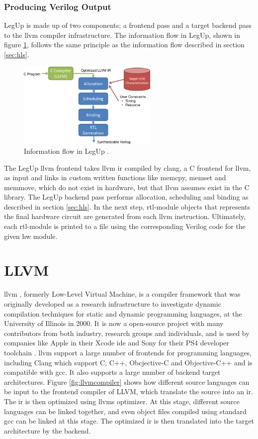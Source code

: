\subsubsection{Producing Verilog Output}
LegUp is made up of two components; a frontend pass and a target backend pass to the \gls{llvm} compiler infrastructure. 
The information flow in LegUp, shown in figure \ref{fig:legupflow}, follows the same principle as the information flow described in section \ref{sec:hls}.
\begin{figure}[hbpt]
\centering
\includegraphics[width=0.6\textwidth]{../figs/LegUpFlow.png}
\caption{\label{fig:legupflow}Information flow in LegUp \cite{legupmaual}.}
\end{figure}
The LegUp \gls{llvm} frontend takes \gls{llvm} \gls{ir} compiled by clang, a C frontend for \gls{llvm}, as input and links in custom written functions like memcpy, memset and memmove, which do not exist in hardware, but that \gls{llvm} assumes exist in the C library. 
The LegUp backend pass performs allocation, scheduling and binding as described in section \ref{sec:hls}. In the next step, \gls{rtl}-module objects that represents the final hardware circuit are generated from each \gls{llvm} instruction. Ultimately, each \gls{rtl}-module is printed to a file using the corresponding Verilog code for the given \gls{hw} module.

\section{\label{sec:LLVM}LLVM}
\gls{llvm} \cite{LLVM:CGO04}, formerly Low-Level Virtual Machine, is a compiler framework that was originally developed as a research infrastructure to investigate dynamic compilation techniques for static and dynamic programming languages, at the University of Illinois in 2000. It is now a open-source project with many contributors from both industry, research groups and individuals, and is used by companies like Apple in their Xcode \gls{ide} \cite{llvmapple} and Sony for their PS4 developer toolchain \cite{llvmsony}. \gls{llvm} support a large number of frontends for programming languages, including Clang \cite{clang} which support C, C++, Obcjective-C and Objective-C++ and is compatible with \gls{gcc}. It also supports a large number of backend target architectures. Figure \ref{fig:llvmcompiler} shows how different source languages can be input to the frontend compiler of LLVM, which translate the source into an \gls{ir}. The \gls{ir} is then optimized using \gls{llvm}s optimizer. At this stage, different source languages can be linked together, and even object files compiled using standard \gls{gcc} can be linked at this stage. The optimized \gls{ir} is then translated into the target architecture by the backend.

